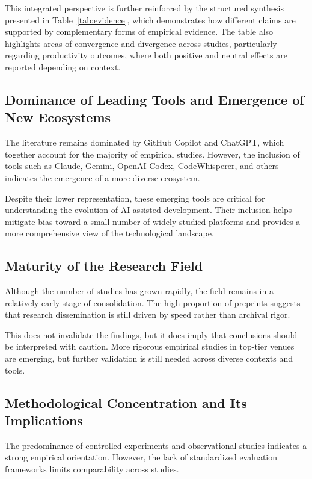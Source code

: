 \documentclass[conference]{IEEEtran}
\begin{document}
This integrated perspective is further reinforced by the structured synthesis presented in Table~\ref{tab:evidence}, which demonstrates how different claims are supported by complementary forms of empirical evidence. The table also highlights areas of convergence and divergence across studies, particularly regarding productivity outcomes, where both positive and neutral effects are reported depending on context.

\subsection{Dominance of Leading Tools and Emergence of New Ecosystems}

The literature remains dominated by GitHub Copilot and ChatGPT, which together account for the majority of empirical studies. However, the inclusion of tools such as Claude, Gemini, OpenAI Codex, CodeWhisperer, and others indicates the emergence of a more diverse ecosystem.

Despite their lower representation, these emerging tools are critical for understanding the evolution of AI-assisted development. Their inclusion helps mitigate bias toward a small number of widely studied platforms and provides a more comprehensive view of the technological landscape.

\subsection{Maturity of the Research Field}

Although the number of studies has grown rapidly, the field remains in a relatively early stage of consolidation. The high proportion of preprints suggests that research dissemination is still driven by speed rather than archival rigor.

This does not invalidate the findings, but it does imply that conclusions should be interpreted with caution. More rigorous empirical studies in top-tier venues are emerging, but further validation is still needed across diverse contexts and tools.

\subsection{Methodological Concentration and Its Implications}

The predominance of controlled experiments and observational studies indicates a strong empirical orientation. However, the lack of standardized evaluation frameworks limits comparability across studies.
\end{document}
